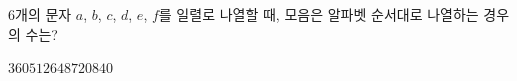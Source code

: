 $6$개의 문자 $a$, $b$, $c$, $d$, $e$, $f$를 일렬로 나열할 때, 모음은 알파벳 순서대로 나열하는 경우의 수는?
\begin{choices32}{$360$}{$512$}{$648$}{$720$}{$840$}\end{choices32}
